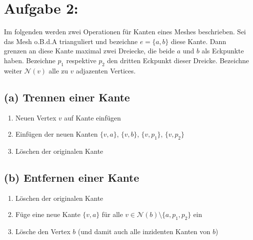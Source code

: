 \section*{Aufgabe 2: }
Im folgenden werden zwei Operationen für Kanten eines Meshes beschrieben. Sei das Mesh o.B.d.A trianguliert und bezeichne $e = \{a, b\}$ diese Kante. Dann grenzen an diese Kante maximal zwei Dreiecke, die beide $a$ und $b$ als Eckpunkte haben. Bezeichne $p_1$ respektive $p_2$ den dritten Eckpunkt dieser Dreicke. Bezeichne weiter $\mathcal{N}(v)$ alle  zu $v$ adjazenten Vertices.
\subsection*{(a) Trennen einer Kante}
\begin{enumerate}
\item Neuen Vertex $v$ auf Kante einfügen
\item Einfügen der neuen Kanten $\{v, a\}$, $\{v, b\}$, $\{v, p_1\}$, $\{v, p_2\}$
\item Löschen der originalen Kante
\end{enumerate}
\subsection*{(b) Entfernen einer Kante}
\begin{enumerate}
\item Löschen der originalen Kante
\item Füge eine neue Kante $\{v, a\}$ für alle $v \in \mathcal{N}(b)\setminus\{a, p_1, p_2\}$ ein
\item Lösche den Vertex $b$ (und damit auch alle inzidenten Kanten von $b$)
\end{enumerate}
